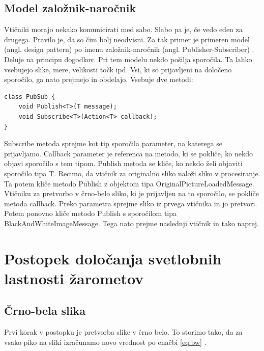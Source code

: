 \documentclass[oneside, a4paper, 12pt]{book}
\begin{document}
\subsection{Model založnik-naročnik}
Vtičniki morajo nekako komunicirati med sabo. Slabo pa je, če vedo 
eden za drugega. Pravilo je, da so čim bolj neodvisni. Za tak primer 
je primeren model (angl. design pattern) po imenu založnik-naročnik 
(angl. Publisher-Subscriber) \cite{oreilly-dp, oreilly-cs}. Deluje na 
principu dogodkov. Pri tem modelu nekdo pošilja sporočila. Ta lahko 
vsebujejo slike, mere, velikosti točk ipd. Vsi, ki so prijavljeni na 
določeno sporočilo, ga nato prejmejo in obdelajo. Vsebuje dve metodi:
\begin{samepage}
\begin{verbatim}
class PubSub {
    void Publish<T>(T message);
    void Subscribe<T>(Action<T> callback);
}
\end{verbatim}
\end{samepage}
Subscribe metoda sprejme kot tip sporočila parameter, na katerega se 
prijavljamo. Callback parameter je referenca na metodo, ki se pokliče, 
ko nekdo objavi sporočilo s tem tipom. Publish metoda se kliče, ko nekdo 
želi objaviti sporočilo tipa T. Recimo, da vtičnik za originalno sliko 
naloži sliko v procesiranje. Ta potem kliče metodo Publish z objektom 
tipa OriginalPictureLoadedMessage. Vtičniku za pretvorbo v črno-belo 
sliko, ki je prijavljen na to sporočilo, se pokliče metoda callback. 
Preko parametra sprejme sliko iz prvega vtičnika in jo pretvori. Potem 
ponovno kliče metodo Publish s sporočilom tipa 
Black\-And\-White\-Image\-Message. Tega nato prejme naslednji vtičnik 
in tako naprej.

\section{Postopek določanja svetlobnih lastnosti žarometov}
\subsection{Črno-bela slika}
Prvi korak v postopku je pretvorba slike v črno belo. To storimo tako, 
da za vsako piko na sliki izračunamo novo vrednost po enačbi \ref{eq:bw} 
\cite{LHS}.
\end{document}
